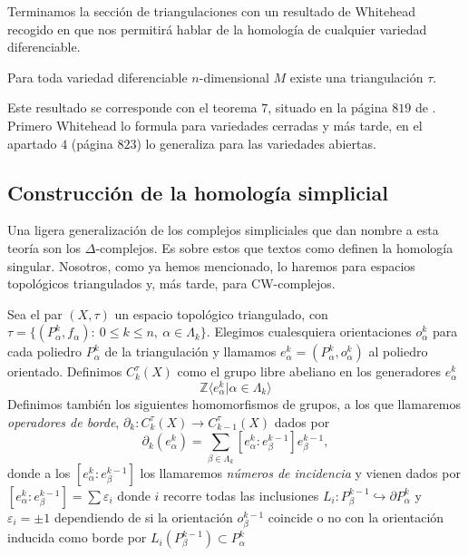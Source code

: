 \bigskip

Terminamos la sección de triangulaciones con un resultado de Whitehead recogido en \cite{Whitehead1978} que nos permitirá hablar de la homología de cualquier variedad diferenciable.

\begin{theorem}
    Para toda variedad diferenciable $n$-dimensional $M$ existe una triangulación $\tau$.
\end{theorem}

Este resultado se corresponde con el teorema $7$, situado en la página $819$ de \cite{Whitehead1978}. Primero Whitehead lo formula para variedades cerradas y más tarde, en el apartado $4$ (página $823$) lo generaliza para las variedades abiertas.
\bigskip


\subsection{Construcción de la homología simplicial}

Una ligera generalización de los complejos simpliciales que dan nombre a esta teoría son los $\Delta$-complejos. Es sobre estos que textos como \cite{hatcher2002} definen la homología singular. Nosotros, como ya hemos mencionado, lo haremos para espacios topológicos triangulados y, más tarde, para CW-complejos.

\bigskip

\begin{definition}
    Sea el par $(X,\tau)$ un espacio topológico triangulado, con $\tau = \{(P^k_{\alpha}, f_{\alpha}): ~0\le k \le n, ~\alpha\in \Lambda_k\}$. Elegimos cualesquiera orientaciones $o^k_{\alpha}$ para cada poliedro $P^k_{\alpha}$ de la triangulación y llamamos $e^k_{\alpha}=(P^k_{\alpha},o^k_{\alpha})$ al poliedro orientado. Definimos $C^{\tau}_k(X)$ como el grupo libre abeliano en los generadores $e^k_{\alpha}$
    \begin{equation*}
        \mathbb{Z}\langle e^k_{\alpha} | \alpha \in \Lambda_k \rangle
    \end{equation*}
    Definimos también los siguientes homomorfismos de grupos, a los que llamaremos \textit{operadores de borde}, $\partial_k: C^{\tau}_k(X) \to C^{\tau}_{k-1}(X)$ dados por
    \begin{equation*}
        \partial_k(e^k_{\alpha}) = \sum_{\beta\in\Lambda_k} [e^k_{\alpha} : e^{k-1}_{\beta}]e^{k-1}_{\beta},
    \end{equation*}
    donde a los $[e^k_{\alpha} : e^{k-1}_{\beta}]$ los llamaremos \textit{números de incidencia} y vienen dados por $[e^k_{\alpha} : e^{k-1}_{\beta}] = \sum \varepsilon_i$ donde $i$ recorre todas las inclusiones $L_i: P^{k-1}_{\beta} \hookrightarrow \partial P^k_{\alpha}$ y $\varepsilon_i=\pm 1$ dependiendo de si la orientación $o^{k-1}_{\beta}$ coincide o no con la orientación inducida como borde por $L_i(P^{k-1}_{\beta})\subset P^k_{\alpha}$
\end{definition}

